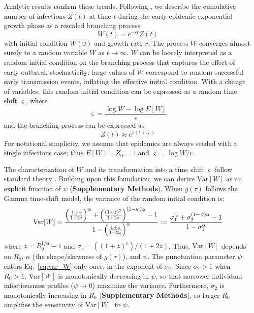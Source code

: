 Analytic results confirm these trends. Following \citet{morris_computation_2024}, we describe the cumulative number of infections $Z(t)$ at time $t$ during the early-epidemic exponential growth phase as a rescaled branching process 
\begin{equation}
	W(t) = e^{-rt}Z(t)
\end{equation}
with initial condition $W(0)$ and growth rate $r$. The process $W$ converges almost surely to a random variable $W$ as $t \rightarrow \infty$. $W$ can be loosely interpreted as a random initial condition on the branching process that captures the effect of early-outbreak stochasticity: large values of $W$ correspond to random successful early transmission events, inflating the effective initial condition. With a change of variables, this random initial condition can be expressed as a random time shift $\varsigma$, where 
\begin{equation}
	\varsigma = \frac{\log W - \log E[W]}{r}
\end{equation}
and the branching process can be expressed as 
\begin{equation}
	Z(t) \approx e^{r (t + \varsigma) }
\end{equation}
For notational simplicity, we assume that epidemics are always seeded with a single infectious case; thus $E[W] = Z_0 = 1$ and $\varsigma = \log W / r$. 

The characterization of $W$ and its transformation into a time shift $\varsigma$ follow standard theory \citep{morris_computation_2024}. Building upon this foundation, we can derive $\text{Var}[W]$ as an explicit function of $\psi$ ({\bf Supplementary Methods}). When $g(\tau)$ follows the Gamma time-shift model, the variance of the random initial condition  is: 
\begin{equation}
	\text{Var}[W] = \frac{
		\Bigl(\frac{1 + z}{1 + 2z}\Bigr)^\alpha + \Bigl(\frac{(1 + z)^2}{1 + 2z}\Bigr)^{(1-\psi) \alpha} - 1
	}{
		1 - \Bigl(\frac{1 + z}{1 + 2z}\Bigr)^\alpha
	} := 
	\frac{\sigma_1^\alpha + \sigma_2^{(1-\psi)\alpha} - 1}{1 - \sigma_1^\alpha}
	\label{eq:var_W}
\end{equation}
where $z = R_0^{1/\alpha} - 1$ and $\sigma_c = ((1 + z)^c)/(1+2z)$. Thus, $\text{Var}[W]$ depends on $R_0$, $\alpha$ (the shape/skewness of $g(\tau)$), and $\psi$. The punctuation parameter $\psi$ enters Eq.~\ref{eq:var_W} only once, in the exponent of $\sigma_2$. Since $\sigma_2 > 1$ when $R_0 > 1$, $\text{Var}[W]$ is monotonically decreasing in $\psi$, so that narrower individual infectiousness profiles ($\psi \rightarrow 0$) maximize the variance. Furthermore, $\sigma_2$ is monotonically increasing in $R_0$ ({\bf Supplementary Methods}), so larger $R_0$ amplifies the sensitivity of $\text{Var}[W]$ to $\psi$. 

